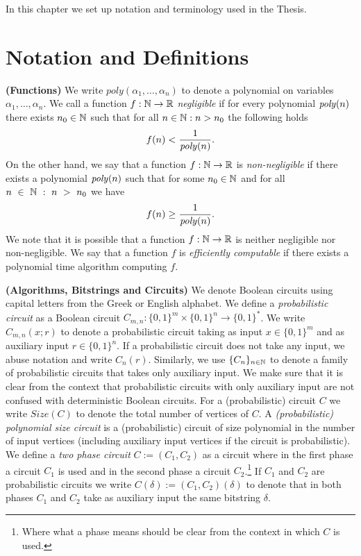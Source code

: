 In this chapter we set up notation and terminology used in the Thesis.
%
\section{Notation and Definitions}
\textbf{(Functions)}
We write $\mathit{poly}(\alpha_1, \dots, \alpha_n)$ to denote a polynomial on variables $\alpha_1, \dots, \alpha_n$.
We call a function $f: \mathbb{N} \rightarrow \mathbb{R}$ \textit{negligible} if for every polynomial $\operatorname{\mathit{poly}}(n)$
there exists $n_0 \in \mathbb{N}$ such that for all $n \in \mathbb{N} : n > n_0$ the following holds
\begin{align*}
f(n) < \frac{1}{\operatorname{\mathit{poly}}(n)}.
\end{align*}
On the other hand, we say that a function $f: \mathbb{N} \rightarrow \mathbb{R}$ is \textit{non-negligible} if
there exists a polynomial $\operatorname{\mathit{poly}}(n)$ such that for some $n_0 \in \mathbb{N}$ and for all $n~\in~\mathbb{N}~:~n~>~n_0$ we have
\begin{align*}
  f(n) \geq \frac{1}{\operatorname{\mathit{poly}}(n)}.
\end{align*}
We note that it is possible that a function $f:\mathbb{N} \rightarrow \mathbb{R}$ is neither negligible nor non-negligible.
We say that a function $f$ is \textit{efficiently computable} if there exists a polynomial time algorithm computing $f$.

\textbf{(Algorithms, Bitstrings and Circuits)}
We denote Boolean circuits using capital letters from the Greek or English alphabet.
We define a \textit{probabilistic circuit} as a Boolean circuit $C_{m,n} : \{0,1\}^{m} \times \{0,1\}^{n} \rightarrow \{0,1\}^{*}$.
We write $C_{m,n}(x;r)$ to denote a probabilistic circuit taking as input  $x \in \{0,1\}^{m}$ and as auxiliary input $r \in \{0,1\}^{n}$.
If a probabilistic circuit does not take any input, we abuse notation and write $C_{n}(r)$.
Similarly, we use $\{C_n\}_{n \in \mathbb{N}}$ to denote a family of probabilistic circuits that takes only auxiliary input.
We make sure that it is clear from the context that probabilistic circuits with only auxiliary input
are not confused with deterministic Boolean circuits.
For a (probabilistic) circuit $C$ we write $\mathit{Size}(C)$ to denote the total number of vertices of $C$.
A \textit{(probabilistic) polynomial size circuit} is a (probabilistic) circuit of size polynomial in the number of input vertices
(including auxiliary input vertices if the circuit is probabilistic).
We define a \textit{two phase circuit} $C := (C_1, C_2)$ as a circuit where in the first phase a circuit $C_1$ is used and in the second phase a circuit $C_2$.\footnote{Where what a phase means should be clear from the context in which $C$ is used.}
If $C_1$ and $C_2$ are probabilistic circuits we write $C(\delta) := (C_1, C_2)(\delta)$ to denote that in both phases $C_1$ and $C_2$ take
as auxiliary input the same bitstring $\delta$.

